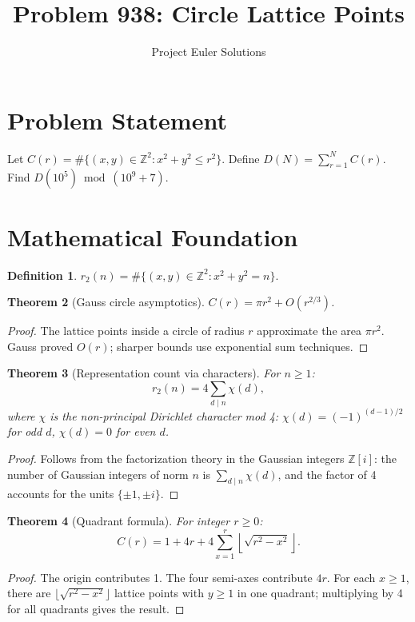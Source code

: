 \documentclass[11pt]{article}
\title{Problem 938: Circle Lattice Points}
\author{Project Euler Solutions}
\date{}
\newtheorem{theorem}{Theorem}
\theoremstyle{definition}
\newtheorem{definition}[theorem]{Definition}
\begin{document}
\maketitle

\section{Problem Statement}

Let $C(r) = \#\{(x,y) \in \mathbb{Z}^2 : x^2 + y^2 \leq r^2\}$. Define $D(N) = \sum_{r=1}^{N} C(r)$. Find $D(10^5) \bmod (10^9 + 7)$.

\section{Mathematical Foundation}

\begin{definition}
$r_2(n) = \#\{(x, y) \in \mathbb{Z}^2 : x^2 + y^2 = n\}$.
\end{definition}

\begin{theorem}[Gauss circle asymptotics]
$C(r) = \pi r^2 + O(r^{2/3})$.
\end{theorem}

\begin{proof}
The lattice points inside a circle of radius $r$ approximate the area $\pi r^2$. Gauss proved $O(r)$; sharper bounds use exponential sum techniques.
\end{proof}

\begin{theorem}[Representation count via characters]
For $n \geq 1$:
\[
r_2(n) = 4 \sum_{d \mid n} \chi(d),
\]
where $\chi$ is the non-principal Dirichlet character mod 4: $\chi(d) = (-1)^{(d-1)/2}$ for odd $d$, $\chi(d) = 0$ for even $d$.
\end{theorem}

\begin{proof}
Follows from the factorization theory in the Gaussian integers $\mathbb{Z}[i]$: the number of Gaussian integers of norm $n$ is $\sum_{d \mid n} \chi(d)$, and the factor of 4 accounts for the units $\{\pm 1, \pm i\}$.
\end{proof}

\begin{theorem}[Quadrant formula]
For integer $r \geq 0$:
\[
C(r) = 1 + 4r + 4\sum_{x=1}^{r} \left\lfloor \sqrt{r^2 - x^2} \right\rfloor.
\]
\end{theorem}

\begin{proof}
The origin contributes 1. The four semi-axes contribute $4r$. For each $x \geq 1$, there are $\lfloor \sqrt{r^2 - x^2} \rfloor$ lattice points with $y \geq 1$ in one quadrant; multiplying by 4 for all quadrants gives the result.
\end{proof}
\end{document}
